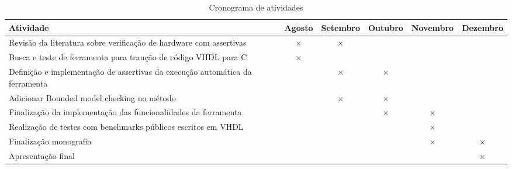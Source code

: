 \label{chapter:cronograma}
\begin{table}[htbp]
  \centering
  \caption{Cronograma de atividades}
  \label{tab:cronograma}
  \begin{tabularx}{\textwidth}{|X|c|c|c|c|c|}
    \hline
    \textbf{Atividade} & \textbf{Agosto} & \textbf{Setembro} & \textbf{Outubro} & \textbf{Novembro} & \textbf{Dezembro} \\
    \hline
    Revisão da literatura sobre verificação de hardware com assertivas & \(\times\) & \(\times\) & & & \\
    \hline
    Busca e teste de ferramenta para traução de código VHDL para C & \(\times\) & & & & \\
    \hline
    Definição e implementação de assertivas da execução automática da ferramenta & & \(\times\) & \(\times\) & & \\
    \hline
    Adicionar Bounded model checking no método & & \(\times\) & \(\times\) & &  \\
    \hline
    Finalização da implementação das funcionalidades da ferramenta & & & \(\times\) & \(\times\) &  \\
    \hline
    Realização de testes com benchmarks públicos escritos em VHDL & & &  & \(\times\) & \\
    \hline
    Finalização monografia & & & & \(\times\) & \(\times\) \\
    \hline
    Apresentação final & & & &  & \(\times\) \\
    \hline
  \end{tabularx}
\end{table}